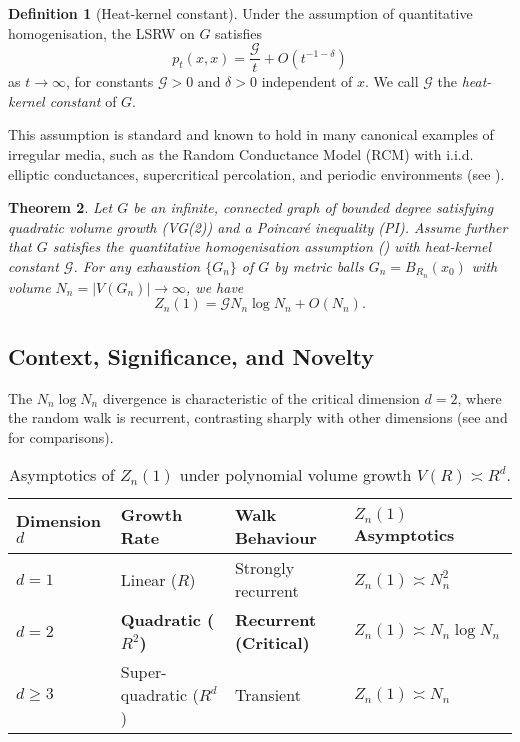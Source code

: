 \documentclass{article}
\numberwithin{equation}{section}
\newtheorem{theorem}{Theorem}[section]
\theoremstyle{definition}
\newtheorem{definition}[theorem]{Definition}
\theoremstyle{remark}
\newcommand{\cG}{\mathcal{G}}
\begin{document}
\begin{definition}[Heat-kernel constant]\label{def:G}
Under the assumption of quantitative homogenisation, the LSRW on $G$ satisfies
\[
  p_t(x,x)=\frac{\cG}{t}+O(t^{-1-\delta})
\]
as $t\to\infty$, for constants $\cG>0$ and $\delta>0$ independent of $x$. We call $\cG$ the \emph{heat-kernel constant} of $G$.
\end{definition}

This assumption is standard and known to hold in many canonical examples of irregular media, such as the Random Conductance Model (RCM) with i.i.d. elliptic conductances, supercritical percolation, and periodic environments (see ).

\begin{theorem}\label{thm:main}
Let $G$ be an infinite, connected graph of bounded degree satisfying quadratic volume growth (VG(2)) and a Poincaré inequality (PI). Assume further that $G$ satisfies the quantitative homogenisation assumption () with heat-kernel constant $\cG$. For any exhaustion $\{G_n\}$ of $G$ by metric balls $G_n = B_{R_n}(x_0)$ with volume $N_n = |V(G_n)| \to \infty$, we have
\[
Z_n(1) = \cG N_n \log N_n + O(N_n).
\]
\end{theorem}

\subsection{Context, Significance, and Novelty}
The $N_n \log N_n$ divergence is characteristic of the critical dimension $d=2$, where the random walk is recurrent, contrasting sharply with other dimensions (see  and  for comparisons).

\begin{table}[h!]
\centering
\caption{Asymptotics of $Z_n(1)$ under polynomial volume growth $V(R) \asymp R^d$.}
\label{tab:growth}
\begin{tabular}{@{}llll@{}}
\toprule
\textbf{Dimension} $d$ & \textbf{Growth Rate} & \textbf{Walk Behaviour} & $Z_n(1)$ \textbf{Asymptotics} \\
\midrule
$d=1$ & Linear ($R$) & Strongly recurrent & $Z_n(1) \asymp N_n^2$ \\
\textbf{$d=2$} & \textbf{Quadratic ($R^2$)} & \textbf{Recurrent (Critical)} & $Z_n(1) \asymp N_n \log N_n$ \\
$d\geq 3$ & Super-quadratic ($R^d$) & Transient & $Z_n(1) \asymp N_n$ \\
\bottomrule
\end{tabular}
\end{table}
\end{document}
